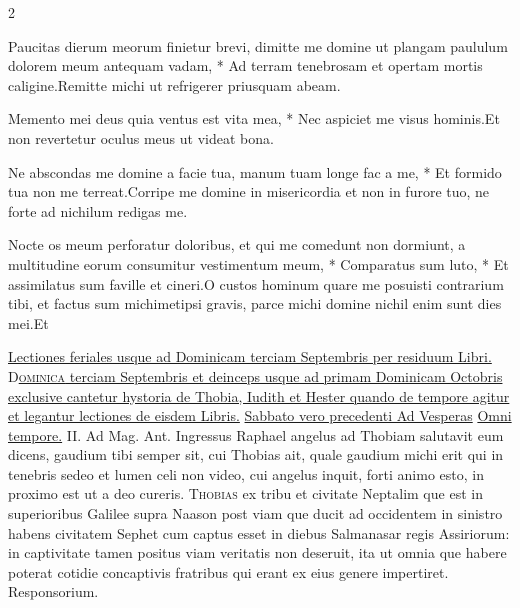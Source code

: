 \begin{multicols*}{2}
\begin{responsory-doxology}
{Paucitas dierum meorum finietur brevi, dimitte me domine ut plangam paululum dolorem meum antequam vadam, * Ad terram tenebrosam et opertam mortis caligine.}{Remitte michi ut refrigerer priusquam abeam.}
\end{responsory-doxology}%
\begin{responsory}
{Memento mei deus quia ventus est vita mea, * Nec aspiciet me visus hominis.}{Et non revertetur oculus meus ut videat bona.}
\end{responsory}%
\begin{responsory}[ne-abscondas-me]
{Ne abscondas me domine a facie tua, manum tuam longe fac a me, * Et formido tua non me terreat.}{Corripe me domine in misericordia et non in furore tuo, ne forte ad nichilum redigas me.}
\end{responsory}%
\begin{responsory-final}
{Nocte os meum perforatur doloribus, et qui me comedunt non dormiunt, a multitudine eorum consumitur vestimentum meum, * Comparatus sum luto, * Et assimilatus sum faville et cineri.}{O custos hominum quare me posuisti contrarium tibi, et factus sum michimetipsi gravis, parce michi domine nichil enim sunt dies mei.}{Et}
\end{responsory-final}%
\newline \ul{Lectiones feriales usque ad Dominicam terciam Septembris per residuum Libri.}
\lettrine[lines=2]{\zallmancaps \color{Blue} D}{}\ul{\textsc{ominica} terciam Septembris et deinceps usque ad primam Dominicam Octobris exclusive cantetur hystoria de Thobia, Iudith et Hester quando de tempore agitur et legantur lectiones de eisdem Libris.}
{\color{Red} }
\newline \ul{Sabbato vero precedenti Ad Vesperas} \R \hyperlink{omni-tempore}{Omni tempore.} {\color{Red} II. Ad Mag. Ant.} Ingressus Raphael angelus ad Thobiam salutavit eum dicens, gaudium tibi semper sit, cui Thobias ait, quale gaudium michi erit qui in tenebris sedeo et lumen celi non video, cui angelus inquit, forti animo esto, in proximo est ut a deo cureris.
\lettrine[lines=2]{\zallmancaps \color{Red} T}{hobias} ex tribu et civitate Neptalim que est in superioribus Galilee supra Naason post viam que ducit ad occidentem in sinistro habens civitatem Sephet cum captus esset in diebus Salmanasar regis Assiriorum: in captivitate tamen positus viam veritatis non deseruit, ita ut omnia que habere poterat cotidie concaptivis fratribus qui erant ex eius genere impertiret. {\color{Red} Responsorium.}

\end{multicols*}
